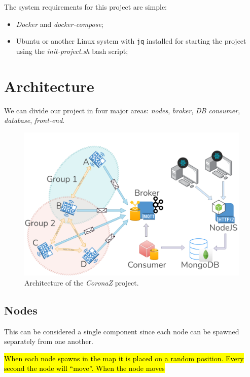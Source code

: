 \documentclass[conference]{IEEEtran}
\begin{document}
		The system requirements for this project are simple:
		\begin{itemize}
			\item \textit{Docker} and \textit{docker-compose};
			\item Ubuntu or another Linux system with \texttt{jq} installed for starting the project using the \textit{init-project.sh} bash script;
		\end{itemize}

\section{Architecture}\label{sec:architecture}
	
	We can divide our project in four major areas: \textit{nodes}, \textit{broker}, \textit{DB consumer}, \textit{database}, \textit{front-end}.

	\begin{figure}[htbp]
		\centerline{\includegraphics[width=\linewidth]{img/coronaz.png}}
		\caption{Architecture of the \textit{CoronaZ} project.}
		\label{fig:architecture}
	\end{figure}
	
	\subsection{Nodes}
	
		This can be considered a single component since each node can be spawned separately from one another.
		
		\hl{When each node spawns in the map it is placed on a random position.
		Every second the node will ``move''.
		When the node moves}
		
\end{document}
